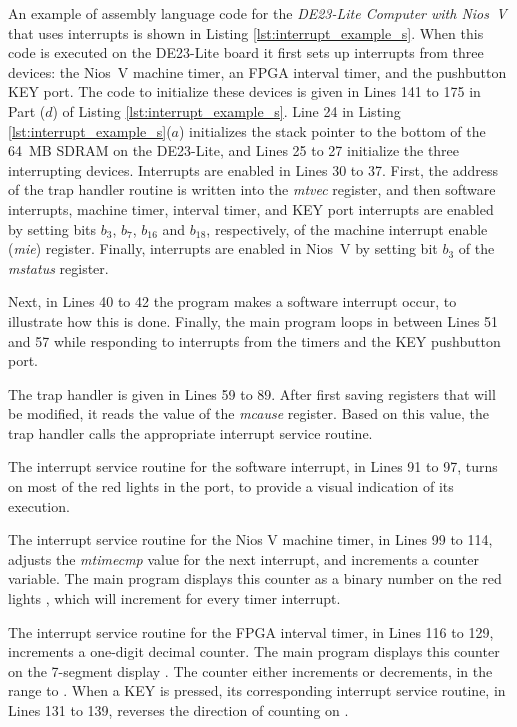 \documentclass[11pt, twoside, pdftex]{article}
\newcommand{\DEBoard}{DE23-Lite}
\newcommand{\systemNameFull}{DE23-Lite Computer with Nios~V}
\begin{document}
An example of assembly language code for the {\it \systemNameFull} that uses interrupts is
shown in Listing \ref{lst:interrupt_example_s}. When this code is executed on the
{\DEBoard} board it first sets up interrupts from three devices: the Nios~V machine timer, 
an FPGA interval timer, and the pushbutton KEY port. The code to initialize these devices
is given in Lines 141 to 175 in Part ($d$) of Listing \ref{lst:interrupt_example_s}. 
Line 24 in Listing \ref{lst:interrupt_example_s}($a$) initializes the stack pointer to
the bottom of the 64~MB SDRAM on the {\DEBoard}, and Lines 25 to 27 initialize the
three interrupting devices. Interrupts are enabled in Lines 30 to 37. First, the address of
the trap handler routine is written into the {\it mtvec} register, and then software
interrupts, machine timer, interval timer, and KEY port interrupts are
enabled by setting bits $b_3$, $b_7$, $b_{16}$ and $b_{18}$, respectively, of the 
machine interrupt enable ({\it mie}) register. 
Finally, interrupts are enabled in Nios~V by setting bit $b_3$ of the {\it mstatus} register.

Next, in Lines 40 to 42 the program makes a software 
interrupt occur, to illustrate how this is done. Finally, the main program loops in
between Lines 51 and 57 while responding to interrupts from the timers and the 
KEY pushbutton port. 

The trap handler is given in Lines 59 to 89. After first saving registers that will be
modified, it reads the value of the {\it mcause} register. Based on this value, the trap
handler calls the appropriate interrupt service routine. 

The interrupt service routine for the software interrupt, in Lines 91 to 97, 
turns on most of the red lights in the  port, to provide a visual indication of 
its execution. 

The interrupt service routine for the Nios V machine timer, in Lines 99 to 114,
adjusts the {\it mtimecmp} value for the next interrupt, and 
increments a counter variable. The main program displays this counter as a binary number 
on the red lights , which will increment for every timer interrupt.

The interrupt service routine for the FPGA interval timer, in Lines 116 to 129,
increments a one-digit decimal counter. The main program displays this counter on the 
7-segment display . The counter either increments or decrements,
in the range  to .  When a KEY is pressed, its corresponding 
interrupt service routine, in Lines 131 to 139, reverses the direction of counting on . 
\end{document}
